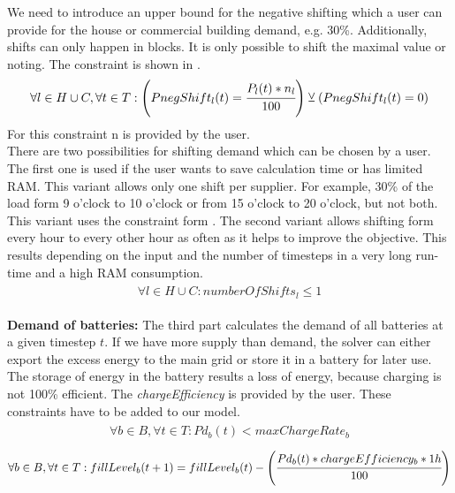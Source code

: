 We need to introduce an upper bound for the negative shifting which a user can provide for the house or commercial building demand, e.g. 30\%. Additionally, shifts can only happen in blocks. It is only possible to shift the maximal value or noting. 
The constraint  is shown in .
\begin{align} \label{eq:shiftingUpperBound}
\begin{split}
\forall l \in H\cup C, \forall t \in T: \left(PnegShift_l(t) = \cfrac{P_{l}(t) * n_{l}}{100}\right) \veebar (PnegShift_{l}(t) = 0)
\end{split}
\end{align}
For this constraint n is provided by the user.\\
There are two possibilities for shifting demand which can be chosen by a user. The first one is used if the user wants to save calculation time or has limited RAM. This variant allows only one shift per supplier. For example, 30\% of the load form 9 o'clock to 10 o'clock or from 15 o'clock to 20 o'clock, but not both. This variant uses the constraint form . The second variant allows shifting form every hour to every other hour as often as it helps to improve the objective. This results depending on the input and the number of timesteps in a very long run-time and a high RAM consumption.
\begin{align} \label{eq:numberOfShifts}
\begin{split}
\forall l \in H\cup C: numberOfShifts_{l} \leq 1
\end{split}
\end{align}

\textbf{Demand of batteries:}
The third part calculates the demand of all batteries at a given timestep $t$.
If we have more supply than demand, the solver can either export the excess energy to the main grid or store it in a battery for later use.
The storage of energy in the battery results a loss of energy, because charging is not 100\% efficient. The \textit{chargeEfficiency} is provided by the user. These constraints have to be added to our model.
\begin{align} \label{eq:limitCharge}
\begin{split}
\forall b \in B, \forall t \in T: Pd_{b}(t) < maxChargeRate_{b}
\end{split}
\end{align}
\begin{align} \label{eq:effi}
\begin{split}
\forall b \in B, \forall t \in T: fillLevel_{b}(t+1) = fillLevel_{b}(t) - \left( \cfrac{Pd_{b}(t)*chargeEfficiency_b * 1h}{100}\right)
\end{split}
\end{align}

